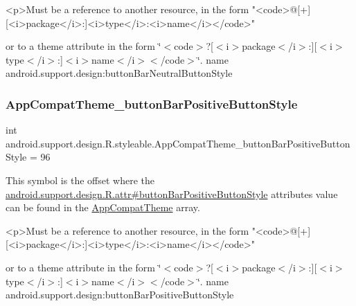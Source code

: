 \begin{DoxyVerb}      <p>Must be a reference to another resource, in the form "<code>@[+][<i>package</i>:]<i>type</i>:<i>name</i></code>"
\end{DoxyVerb}
 or to a theme attribute in the form \char`\"{}$<$code$>$?\mbox{[}$<$i$>$package$<$/i$>$\+:\mbox{]}\mbox{[}$<$i$>$type$<$/i$>$\+:\mbox{]}$<$i$>$name$<$/i$>$$<$/code$>$\char`\"{}.  name android.\+support.\+design\+:button\+Bar\+Neutral\+Button\+Style \mbox{\label{classandroid_1_1support_1_1design_1_1R_1_1styleable_ad6dccbdc26acca166bca4b6b693c30aa}} 
\subsubsection{\texorpdfstring{App\+Compat\+Theme\+\_\+button\+Bar\+Positive\+Button\+Style}{AppCompatTheme\_buttonBarPositiveButtonStyle}}
{\footnotesize\ttfamily int android.\+support.\+design.\+R.\+styleable.\+App\+Compat\+Theme\+\_\+button\+Bar\+Positive\+Button\+Style = 96\hspace{0.3cm}{\ttfamily [static]}}

This symbol is the offset where the \hyperlink{classandroid_1_1support_1_1design_1_1R_1_1attr_a2048c6806bc0c63b5b6d67b3e669df1c}{android.\+support.\+design.\+R.\+attr\#button\+Bar\+Positive\+Button\+Style} attribute\textquotesingle{}s value can be found in the \hyperlink{classandroid_1_1support_1_1design_1_1R_1_1styleable_afb351dc8de20cbd4c89abe360373010c}{App\+Compat\+Theme} array.

\begin{DoxyVerb}      <p>Must be a reference to another resource, in the form "<code>@[+][<i>package</i>:]<i>type</i>:<i>name</i></code>"
\end{DoxyVerb}
 or to a theme attribute in the form \char`\"{}$<$code$>$?\mbox{[}$<$i$>$package$<$/i$>$\+:\mbox{]}\mbox{[}$<$i$>$type$<$/i$>$\+:\mbox{]}$<$i$>$name$<$/i$>$$<$/code$>$\char`\"{}.  name android.\+support.\+design\+:button\+Bar\+Positive\+Button\+Style \mbox{\label{classandroid_1_1support_1_1design_1_1R_1_1styleable_a434b825974ffc445f7d2c1c0ebca20c2}} 
